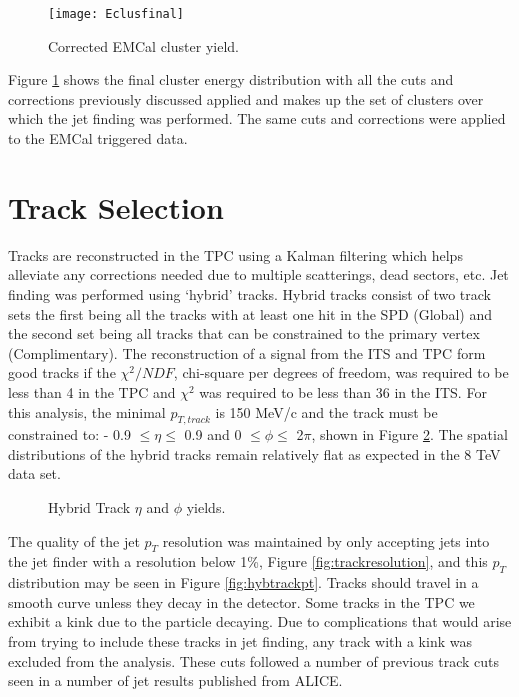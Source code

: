 \begin{figure}[h]
\texttt{[image: Eclusfinal]}
\centering
\caption{Corrected EMCal cluster yield.}
\label{fig:EMCalfinal}
\end{figure}
\newpage

Figure \ref{fig:EMCalfinal} shows the final cluster energy distribution with all the cuts and corrections previously discussed applied and makes up the set of clusters over which the jet finding was performed.  The same cuts and corrections were applied to the EMCal triggered data.

\section{Track Selection}

Tracks are reconstructed in the TPC using a Kalman filtering which helps alleviate any corrections needed due to multiple scatterings, dead sectors, etc.  Jet finding was performed using `hybrid' tracks.  Hybrid tracks consist of two track sets the first being all the tracks with at least one hit in the SPD (Global) and the second set being all tracks that can be constrained to the primary vertex (Complimentary).  The reconstruction of a signal from the ITS and TPC form good tracks if the $\chi^{2}/NDF$, chi-square per degrees of freedom, was required to be less than 4 in the TPC and $\chi^{2}$ was required to be less than 36 in the ITS. For this analysis, the minimal $p_{T, track}$ is 150 MeV/c and the track must be constrained to: - 0.9 $\leq \eta \leq$ 0.9 and 0 $\leq \phi \leq$ 2$\pi$, shown in Figure \ref{fig:Hybridtracketaphi}.  The spatial distributions of the hybrid tracks remain relatively flat as expected in the 8 TeV data set.

\begin{figure}%
    \centering
    \qquad
    \caption{Hybrid Track $\eta$ and $\phi$ yields.}%
    \label{fig:Hybridtracketaphi}%
\end{figure}

\noindent
The quality of the jet $p_{T}$ resolution was maintained by only accepting jets into the jet finder with a resolution below 1\%, Figure \ref{fig:trackresolution}, and this $p_{T}$ distribution may be seen in Figure \ref{fig:hybtrackpt}.  Tracks should travel in a smooth curve unless they decay in the detector.  Some tracks in the TPC we exhibit a kink due to the particle decaying.  Due to complications that would arise from trying to include these tracks in jet finding, any track with a kink was excluded from the analysis.  These cuts followed a number of previous track cuts seen in a number of jet results published from ALICE\cite{Acharya:2018eat}.

